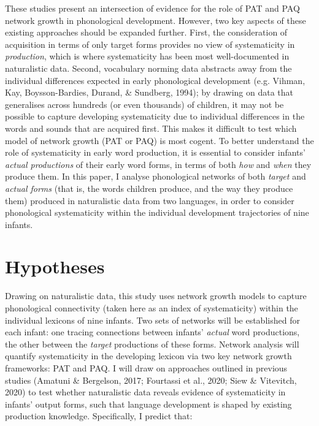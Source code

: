 \documentclass[
  man]{apa6}
\begin{document}
These studies present an intersection of evidence for the role of PAT and PAQ network growth in phonological development. However, two key aspects of these existing approaches should be expanded further. First, the consideration of acquisition in terms of only target forms provides no view of systematicity in \emph{production}, which is where systematicity has been most well-documented in naturalistic data. Second, vocabulary norming data abstracts away from the individual differences expected in early phonological development (e.g. Vihman, Kay, Boysson-Bardies, Durand, \& Sundberg, 1994); by drawing on data that generalises across hundreds (or even thousands) of children, it may not be possible to capture developing systematicity due to individual differences in the words and sounds that are acquired first. This makes it difficult to test which model of network growth (PAT or PAQ) is most cogent. To better understand the role of systematicity in early word production, it is essential to consider infants' \emph{actual productions} of their early word forms, in terms of both \emph{how} and \emph{when} they produce them. In this paper, I analyse phonological networks of both \emph{target} and \emph{actual forms} (that is, the words children produce, and the way they produce them) produced in naturalistic data from two languages, in order to consider phonological systematicity within the individual development trajectories of nine infants.

\hypertarget{hypotheses}{%
\section{Hypotheses}\label{hypotheses}}

Drawing on naturalistic data, this study uses network growth models to capture phonological connectivity (taken here as an index of systematicity) within the individual lexicons of nine infants. Two sets of networks will be established for each infant: one tracing connections between infants' \emph{actual} word productions, the other between the \emph{target} productions of these forms. Network analysis will quantify systematicity in the developing lexicon via two key network growth frameworks: PAT and PAQ. I will draw on approaches outlined in previous studies (Amatuni \& Bergelson, 2017; Fourtassi et al., 2020; Siew \& Vitevitch, 2020) to test whether naturalistic data reveals evidence of systematicity in infants' output forms, such that language development is shaped by existing production knowledge. Specifically, I predict that:
\end{document}
